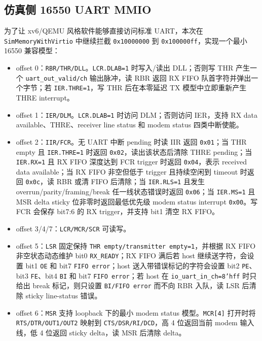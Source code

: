 \documentclass[UTF8,a4paper,11pt]{ctexart}
\begin{document}
\subsection{仿真侧 16550 UART MMIO}

为了让 xv6/QEMU 风格软件能够直接访问标准 UART，本次在 \texttt{SimMemoryWithVirtio} 中继续拦截 \texttt{0x10000000} 到 \texttt{0x100000ff}，实现一个最小 16550 兼容模型：

\begin{itemize}
  \item offset 0：\texttt{RBR/THR/DLL}。\texttt{LCR.DLAB=1} 时写入/读出 DLL；否则写 THR 产生一个 \texttt{uart\_out\_valid/ch} 输出脉冲，读 RBR 返回 RX FIFO 队首字符并弹出一个字节；若 \texttt{IER.THRE=1}，写 THR 后在本零延迟 TX 模型中立即重新产生 THRE interrupt。
  \item offset 1：\texttt{IER/DLM}。\texttt{LCR.DLAB=1} 时访问 DLM；否则访问 IER，支持 RX data available、THRE、receiver line status 和 modem status 四类中断使能。
  \item offset 2：\texttt{IIR/FCR}。无 UART 中断 pending 时读 IIR 返回 \texttt{0x01}；当 THR empty 且 \texttt{IER.THRE=1} 时返回 \texttt{0x02}，读出该状态后清除 THRE pending；当 \texttt{IER.RX=1} 且 RX FIFO 深度达到 FCR trigger 时返回 \texttt{0x04}，表示 received data available；当 RX FIFO 非空但低于 trigger 且持续空闲到 timeout 时返回 \texttt{0x0c}，读 RBR 或清 FIFO 后清除；当 \texttt{IER.RLS=1} 且发生 overrun/parity/framing/break 任一线状态错误时返回 \texttt{0x06}；当 \texttt{IER.MS=1} 且 MSR delta sticky 位非零时返回最低优先级 modem status interrupt \texttt{0x00}。写 FCR 会保存 bit7:6 的 RX trigger，并支持 bit1 清空 RX FIFO。
  \item offset 3/4/7：\texttt{LCR/MCR/SCR} 可读写。
  \item offset 5：\texttt{LSR} 固定保持 \texttt{THR empty/transmitter empty=1}，并根据 RX FIFO 非空状态动态维护 bit0 \texttt{RX\_READY}；RX FIFO 满后若 host 继续送字符，会设置 bit1 \texttt{OE} 和 bit7 \texttt{FIFO error}；host 送入带错误标记的字符会设置 bit2 \texttt{PE}、bit3 \texttt{FE}、bit4 \texttt{BI} 和 bit7 \texttt{FIFO error}；若 host 在 \texttt{io\_uart\_in\_ch=8'hff} 时只给出 break 标记，则只设置 \texttt{BI/FIFO error} 而不向 RBR 入队，读 LSR 后清除 sticky line-status 错误。
  \item offset 6：\texttt{MSR} 支持 loopback 下的最小 modem status 模型。\texttt{MCR[4]} 打开时将 \texttt{RTS/DTR/OUT1/OUT2} 映射到 \texttt{CTS/DSR/RI/DCD}，高 4 位返回当前 modem 输入线，低 4 位返回 sticky delta，读 MSR 后清除 delta。
\end{itemize}
\end{document}
